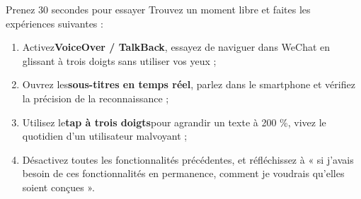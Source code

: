 \begin{tcbpractice}{Prenez 30 secondes pour essayer}
Trouvez un moment libre et faites les expériences suivantes :

\begin{enumerate}
  \item Activez\textbf{VoiceOver / TalkBack}, essayez de naviguer dans WeChat en glissant à trois doigts sans utiliser vos yeux ;
  \item Ouvrez les\textbf{sous-titres en temps réel}, parlez dans le smartphone et vérifiez la précision de la reconnaissance ;
  \item Utilisez le\textbf{tap à trois doigts}pour agrandir un texte à 200 \%, vivez le quotidien d'un utilisateur malvoyant ;
  \item Désactivez toutes les fonctionnalités précédentes, et réfléchissez à « si j'avais besoin de ces fonctionnalités en permanence, comment je voudrais qu'elles soient conçues ».
\end{enumerate}

\end{tcbpractice}
